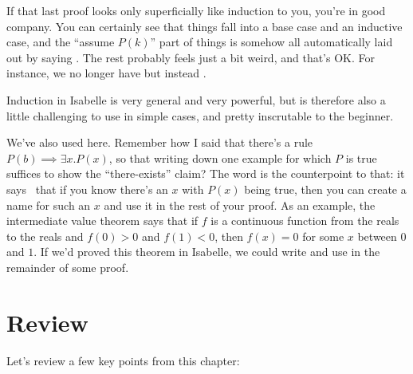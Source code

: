 If that last proof looks only superficially like induction to you, you're in good company. You can certainly see that things fall into a base case and an inductive case, and the ``assume $P(k)$'' part of things is somehow all automatically laid out by saying . The rest probably feels just a bit weird, and that's OK. For instance, we no longer have  but instead . 

Induction in Isabelle is very general and very powerful, but is therefore also a little challenging to use in simple cases, and pretty inscrutable to the beginner.

We've also used  here. Remember how I said that there's a rule $P(b) \implies \exists x . P(x)$, so that writing down one example for which $P$ is true suffices to show the ``there-exists'' claim? The word  is the counterpoint to that: it says  that if you know there's an $x$ with $P(x)$ being true, then you can create a name for such an $x$ and use it in the rest of your proof. As an example, the intermediate value theorem says that if $f$ is a continuous function from the reals to the reals and $f(0) > 0$ and $f(1) < 0$, then $f(x) = 0$ for some $x$ between $0$ and $1$. If we'd proved this theorem in Isabelle, we could write  and use  in the remainder of some proof.  

\section{Review}
Let's review a few key points from this chapter:

